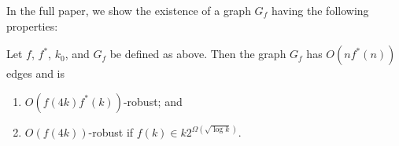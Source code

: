 \documentclass{cccg12}
\begin{document}
\newcommand{\upen}[1]{\llceil#1\rrceil}

In the full paper, we show the existence of a graph $G_f$ having
the following properties:

\begin{thm}
  Let $f$, $f^*$, $k_0$, and $G_f$ be defined as above.  Then the graph
  $G_f$ has $O(nf^*(n))$ edges and is
  \begin{enumerate}
    \item $O(f(4k)f^*(k))$-robust; and 
    \item $O(f(4k))$-robust if $f(k)\in k2^{\Omega(\sqrt{\log k})}$.
  \end{enumerate}
\end{thm}
\end{document}
